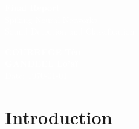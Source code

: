 \documentclass[11pt]{article}
\begin{document}
\pagecolor{darkbluegrey}
\afterpage{\nopagecolor}


\begin{titlepage}
  \begin{center}
    \textcolor{white}{\textbf{\Huge Final Report}}\\
    \vspace{1cm}
    \textcolor{white}{\Large Spiking Neural Networks\\Sound Detection and Classification}
    \vspace{3cm}
  \end{center}
  \begin{center}
    \textcolor{white}{
      \textbf{COURREGE Téo}\\
      \textbf{GANDEEL Lo'aï}\\
      \vspace{1cm}
      \Large Date: \today}
  \end{center}
\end{titlepage}

\newpage

\tableofcontents

\pagebreak

\listoffigures

\pagebreak

\listoftables

\pagebreak

\section{Introduction}
\end{document}
